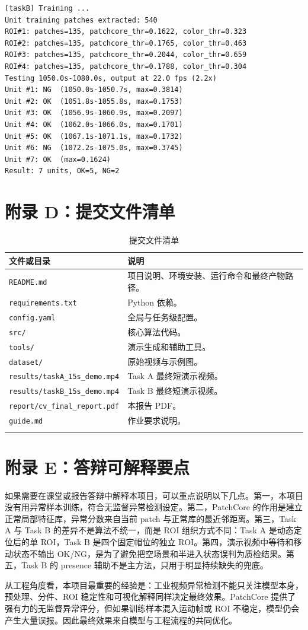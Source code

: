 \documentclass[12pt,hyperref,a4paper,UTF8,fontset=fandol]{ctexart}
\begin{document}
\begin{lstlisting}
[taskB] Training ...
Unit training patches extracted: 540
ROI#1: patches=135, patchcore_thr=0.1622, color_thr=0.323
ROI#2: patches=135, patchcore_thr=0.1765, color_thr=0.463
ROI#3: patches=135, patchcore_thr=0.2044, color_thr=0.659
ROI#4: patches=135, patchcore_thr=0.1788, color_thr=0.304
Testing 1050.0s-1080.0s, output at 22.0 fps (2.2x)
Unit #1: NG  (1050.0s-1050.7s, max=0.3814)
Unit #2: OK  (1051.8s-1055.8s, max=0.1753)
Unit #3: OK  (1056.9s-1060.9s, max=0.2097)
Unit #4: OK  (1062.0s-1066.0s, max=0.1701)
Unit #5: OK  (1067.1s-1071.1s, max=0.1732)
Unit #6: NG  (1072.2s-1075.0s, max=0.3745)
Unit #7: OK  (max=0.1624)
Result: 7 units, OK=5, NG=2
\end{lstlisting}

\newpage
\section{附录 D：提交文件清单}

\begin{longtable}{p{}p{}}
\toprule
文件或目录 & 说明 \\
\midrule
\texttt{README.md} & 项目说明、环境安装、运行命令和最终产物路径。 \\
\texttt{requirements.txt} & Python 依赖。 \\
\texttt{config.yaml} & 全局与任务级配置。 \\
\texttt{src/} & 核心算法代码。 \\
\texttt{tools/} & 演示生成和辅助工具。 \\
\texttt{dataset/} & 原始视频与示例图。 \\
\texttt{results/taskA\_15s\_demo.mp4} & Task A 最终短演示视频。 \\
\texttt{results/taskB\_15s\_demo.mp4} & Task B 最终短演示视频。 \\
\texttt{report/cv\_final\_report.pdf} & 本报告 PDF。 \\
\texttt{guide.md} & 作业要求说明。 \\
\bottomrule
\caption{提交文件清单}
\end{longtable}

\newpage
\section{附录 E：答辩可解释要点}

如果需要在课堂或报告答辩中解释本项目，可以重点说明以下几点。第一，本项目没有用异常样本训练，符合无监督异常检测设定。第二，PatchCore 的作用是建立正常局部特征库，异常分数来自当前 patch 与正常库的最近邻距离。第三，Task A 与 Task B 的差异不是算法不统一，而是 ROI 组织方式不同：Task A 是动态定位后的单 ROI，Task B 是四个固定帽位的独立 ROI。第四，演示视频中等待和移动状态不输出 OK/NG，是为了避免把空场景和半进入状态误判为质检结果。第五，Task B 的 presence 辅助不是主方法，只用于明显持续缺失的兜底。

从工程角度看，本项目最重要的经验是：工业视频异常检测不能只关注模型本身，预处理、分件、ROI 稳定性和可视化解释同样决定最终效果。PatchCore 提供了强有力的无监督异常评分，但如果训练样本混入运动帧或 ROI 不稳定，模型仍会产生大量误报。因此最终效果来自模型与工程流程的共同优化。
\end{document}
